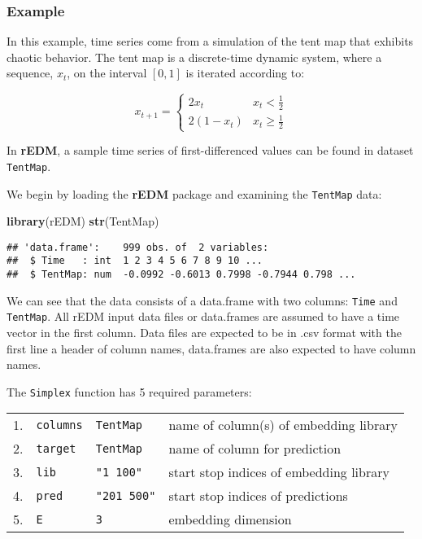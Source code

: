 \documentclass[]{article}
\newenvironment{Shaded}{\begin{snugshade}}{\end{snugshade}}
\newcommand{\KeywordTok}[1]{\textcolor[rgb]{0.13,0.29,0.53}{\textbf{#1}}}
\newcommand{\NormalTok}[1]{#1}
\begin{document}
\hypertarget{example}{%
\subsubsection{Example}\label{example}}

In this example, time series come from a simulation of the tent map that
exhibits chaotic behavior. The tent map is a discrete-time dynamic
system, where a sequence, \(x_t\), on the interval \([0, 1]\) is
iterated according to:

\begin{equation*}
  x_{t+1} = \begin{cases}
            2x_t     & x_t <   \frac{1}{2}\\
            2(1-x_t) & x_t \ge \frac{1}{2}
            \end{cases}
\end{equation*}

In \textbf{rEDM}, a sample time series of first-differenced values can
be found in dataset \texttt{TentMap}.

We begin by loading the \textbf{rEDM} package and examining the
\texttt{TentMap} data:

\begin{Shaded}
\begin{Highlighting}[]
\KeywordTok{library}\NormalTok{(rEDM)}
\KeywordTok{str}\NormalTok{(TentMap)}
\end{Highlighting}
\end{Shaded}

\begin{verbatim}
## 'data.frame':    999 obs. of  2 variables:
##  $ Time   : int  1 2 3 4 5 6 7 8 9 10 ...
##  $ TentMap: num  -0.0992 -0.6013 0.7998 -0.7944 0.798 ...
\end{verbatim}

We can see that the data consists of a data.frame with two columns:
\texttt{Time} and \texttt{TentMap}. All rEDM input data files or
data.frames are assumed to have a time vector in the first column. Data
files are expected to be in .csv format with the first line a header of
column names, data.frames are also expected to have column names.

The \texttt{Simplex} function has 5 required parameters:

\begin{longtable}[]{@{}llll@{}}
\toprule
\endhead
1. & \texttt{columns} & \texttt{TentMap} & name of column(s) of
embedding library\tabularnewline
2. & \texttt{target} & \texttt{TentMap} & name of column for
prediction\tabularnewline
3. & \texttt{lib} & \texttt{"1\ 100"} & start stop indices of embedding
library\tabularnewline
4. & \texttt{pred} & \texttt{"201\ 500"} & start stop indices of
predictions\tabularnewline
5. & \texttt{E} & \texttt{3} & embedding dimension\tabularnewline
\bottomrule
\end{longtable}
\end{document}
